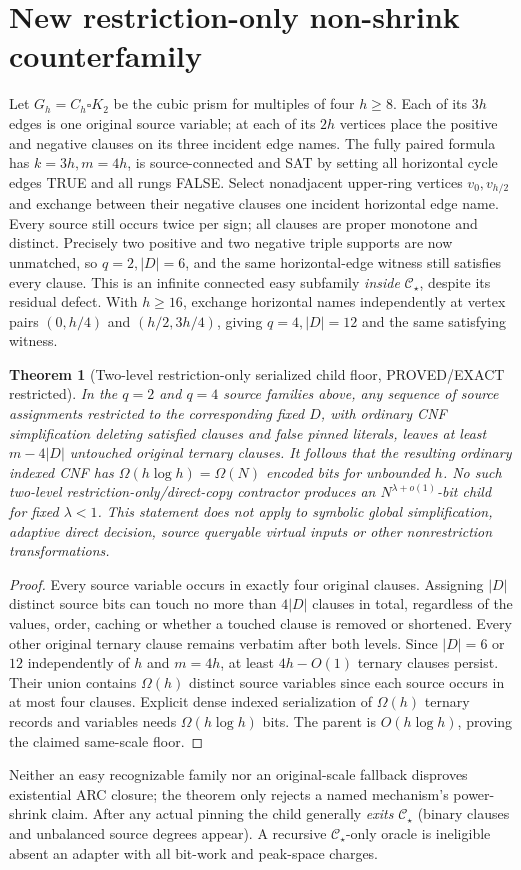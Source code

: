 \documentclass[10pt]{article}
\newtheorem{theorem}{Theorem}
\begin{document}
\section{New restriction-only non-shrink counterfamily}
Let \(G_h=C_h\square K_2\) be the cubic prism for multiples of four \(h\ge8\). Each of its \(3h\) edges is one original source variable; at each of its \(2h\) vertices place the positive and negative clauses on its three incident edge names. The fully paired formula has \(k=3h,m=4h\), is source-connected and SAT by setting all horizontal cycle edges TRUE and all rungs FALSE. Select nonadjacent upper-ring vertices \(v_0,v_{h/2}\) and exchange between their negative clauses one incident horizontal edge name. Every source still occurs twice per sign; all clauses are proper monotone and distinct. Precisely two positive and two negative triple supports are now unmatched, so \(q=2,|D|=6\), and the same horizontal-edge witness still satisfies every clause. This is an infinite connected easy subfamily \emph{inside} \(\mathcal C_\star\), despite its residual defect. With \(h\ge16\), exchange horizontal names independently at vertex pairs \((0,h/4)\) and \((h/2,3h/4)\), giving \(q=4,|D|=12\) and the same satisfying witness.
\begin{theorem}[Two-level restriction-only serialized child floor, PROVED/EXACT restricted]
In the \(q=2\) and \(q=4\) source families above, any sequence of source assignments restricted to the corresponding fixed \(D\), with ordinary CNF simplification deleting satisfied clauses and false pinned literals, leaves at least \(m-4|D|\) \emph{untouched original ternary clauses}. It follows that the resulting ordinary indexed CNF has \(\Omega(h\log h)=\Omega(N)\) encoded bits for unbounded \(h\). No such two-level restriction-only/direct-copy contractor produces an \(N^{\lambda+o(1)}\)-bit child for fixed \(\lambda<1\). This statement does not apply to symbolic global simplification, adaptive direct decision, source queryable virtual inputs or other nonrestriction transformations.
\end{theorem}
\begin{proof}
Every source variable occurs in exactly four original clauses. Assigning \(|D|\) distinct source bits can touch no more than \(4|D|\) clauses in total, regardless of the values, order, caching or whether a touched clause is removed or shortened. Every other original ternary clause remains verbatim after both levels. Since \(|D|=6\) or \(12\) independently of \(h\) and \(m=4h\), at least \(4h-O(1)\) ternary clauses persist. Their union contains \(\Omega(h)\) distinct source variables since each source occurs in at most four clauses. Explicit dense indexed serialization of \(\Omega(h)\) ternary records and variables needs \(\Omega(h\log h)\) bits. The parent is \(O(h\log h)\), proving the claimed same-scale floor.
\end{proof}
Neither an easy recognizable family nor an original-scale fallback disproves existential ARC closure; the theorem only rejects a named mechanism's power-shrink claim. After any actual pinning the child generally \emph{exits} \(\mathcal C_\star\) (binary clauses and unbalanced source degrees appear). A recursive \(\mathcal C_\star\)-only oracle is ineligible absent an adapter with all bit-work and peak-space charges.
\end{document}
